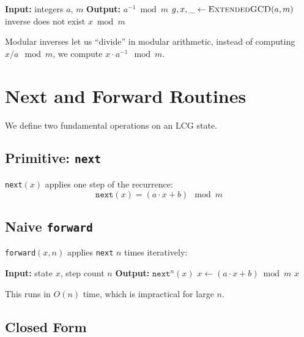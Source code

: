 \documentclass[11pt]{article}
\theoremstyle{plain}
\theoremstyle{definition}
\begin{document}
\begin{algorithm}[H]
\caption{\texttt{mod\_inverse}$(a, m)$}
\begin{algorithmic}[1]
    \State \textbf{Input:} integers $a$, $m$
    \State \textbf{Output:} $a^{-1} \bmod m$
    \State $g, x, \_ \gets \textsc{ExtendedGCD}(a, m)$
        \State \Return inverse does not exist
    \EndIf
    \State \Return $x \bmod m$
\end{algorithmic}
\end{algorithm}

Modular inverses let us ``divide'' in modular arithmetic, instead of computing $x / a \mod m$,
we compute $x \cdot a^{-1} \mod m$.

\section{Next and Forward Routines}

We define two fundamental operations on an LCG state.

\subsection{Primitive: \texttt{next}}

\texttt{next}$(x)$ applies one step of the recurrence:
\[
    \texttt{next}(x) = (a \cdot x + b) \mod m
\]

\subsection{Naive \texttt{forward}}

\texttt{forward}$(x, n)$ applies \texttt{next} $n$ times iteratively:

\begin{algorithm}[H]
\caption{\texttt{forward}$(x, n)$, naive $O(n)$}
\begin{algorithmic}[1]
    \State \textbf{Input:} state $x$, step count $n$
    \State \textbf{Output:} $\texttt{next}^n(x)$
        \State $x \gets (a \cdot x + b) \bmod m$
    \EndFor
    \State \Return $x$
\end{algorithmic}
\end{algorithm}

This runs in $O(n)$ time, which is impractical for large $n$.

\subsection{Closed Form}
\end{document}

